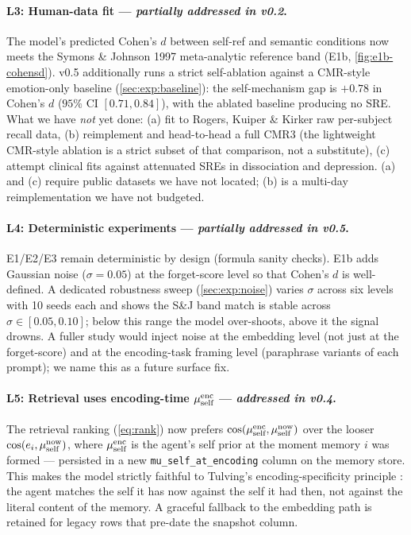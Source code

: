 \paragraph{L3: Human-data fit ---
\textit{partially addressed in v0.2}.} The model's predicted Cohen's
$d$ between self-ref and semantic conditions now meets the Symons \&
Johnson 1997 meta-analytic reference band (E1b, \cref{fig:e1b-cohensd}).
v0.5 additionally runs a strict self-ablation against a CMR-style
emotion-only baseline (\cref{sec:exp:baseline}): the self-mechanism
gap is $+0.78$ in Cohen's $d$ ($95\%$ CI $[0.71, 0.84]$), with the
ablated baseline producing no SRE. What we have \emph{not} yet
done: (a) fit to Rogers, Kuiper \& Kirker \cite{rogers1977sre}
raw per-subject recall data, (b) reimplement and head-to-head a
full CMR3 \cite{cohen2022cmr3} (the lightweight CMR-style ablation
is a strict subset of that comparison, not a substitute),
(c) attempt clinical fits against attenuated SREs in dissociation
and depression. (a) and (c) require public datasets we have not
located; (b) is a multi-day reimplementation we have not budgeted.

\paragraph{L4: Deterministic experiments ---
\textit{partially addressed in v0.5}.} E1/E2/E3 remain deterministic
by design (formula sanity checks). E1b adds Gaussian noise
($\sigma{=}0.05$) at the forget-score level so that Cohen's $d$ is
well-defined. A dedicated robustness sweep (\cref{sec:exp:noise})
varies $\sigma$ across six levels with 10 seeds each and shows the
S\&J band match is stable across $\sigma \in [0.05, 0.10]$; below
this range the model over-shoots, above it the signal drowns. A
fuller study would inject noise at the embedding level (not just at
the forget-score) and at the encoding-task framing level (paraphrase
variants of each prompt); we name this as a future surface fix.

\paragraph{L5: Retrieval uses encoding-time $\mu_{\text{self}}^{\text{enc}}$ ---
\textit{addressed in v0.4}.} The retrieval ranking (\cref{eq:rank})
now prefers $\cos(\mu_{\text{self}}^{\text{enc}}, \mu_{\text{self}}^{\text{now}})$ over
the looser $\cos(e_i, \mu_{\text{self}}^{\text{now}})$, where
$\mu_{\text{self}}^{\text{enc}}$ is the agent's self prior at the moment memory
$i$ was formed --- persisted in a new \texttt{mu\_self\_at\_encoding}
column on the memory store. This makes the model strictly faithful to
Tulving's encoding-specificity principle
\cite{tulving1973encodingspec}: the agent matches the self it has now
against the self it had then, not against the literal content of the
memory. A graceful fallback to the embedding path is retained for
legacy rows that pre-date the snapshot column.

